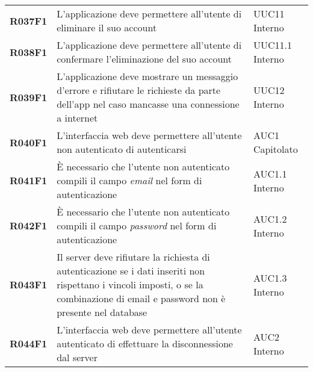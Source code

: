 \documentclass[../analisi-dei-requisiti.tex]{subfiles}
\begin{document}
\begin{longtable}[H]{>{\centering\bfseries}m{3cm} >{\centering}m{10cm} >{\centering\arraybackslash}m{3cm}}
  R037F1                               & L'applicazione deve permettere all'utente di eliminare il suo account                                                                                                                                   & UUC11 Interno                 \\
  R038F1                               & L'applicazione deve permettere all'utente di confermare l'eliminazione del suo account                                                                                                                  & UUC11.1 Interno               \\
  R039F1                               & L'applicazione deve mostrare un messaggio d'errore e rifiutare le richieste da parte dell'app nel caso mancasse una connessione a internet                                                              & UUC12 Interno                 \\

  R040F1                               & L'interfaccia web deve permettere all'utente non autenticato di autenticarsi                                                                                                                            & AUC1 Capitolato               \\
  R041F1                               & È necessario che l'utente non autenticato compili il campo \textit{email} nel form di autenticazione                                                                                                    & AUC1.1 Interno                \\
  R042F1                               & È necessario che l'utente non autenticato compili il campo \textit{password} nel form di autenticazione                                                                                                 & AUC1.2 Interno                \\
  R043F1                               & Il server deve rifiutare la richiesta di autenticazione se i dati inseriti non rispettano i vincoli imposti, o se la combinazione di email e password non è presente nel database                       & AUC1.3 Interno                \\
  R044F1                               & L'interfaccia web deve permettere all'utente autenticato di effettuare la disconnessione dal server                                                                                                     & AUC2 Interno                  \\


\end{longtable}
\end{document}
